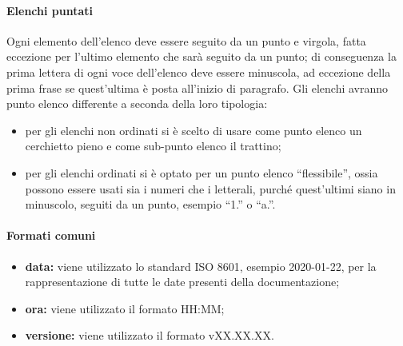 			\paragraph{Elenchi puntati}
				Ogni elemento dell'elenco deve essere seguito da un punto e virgola, fatta eccezione per l'ultimo elemento che sarà seguito da un punto; di conseguenza la prima lettera di ogni voce dell'elenco deve essere minuscola, ad eccezione della prima frase se quest'ultima è posta all'inizio di paragrafo. Gli elenchi avranno punto elenco differente a seconda della loro tipologia:
				\begin{itemize}
					\item per gli elenchi non ordinati si è scelto di usare come punto elenco un cerchietto pieno e come sub-punto elenco il trattino;
					\item per gli elenchi ordinati si è optato per un punto elenco ``flessibile'', ossia possono essere usati sia i numeri che i letterali, purché quest'ultimi siano in minuscolo, seguiti da un punto, esempio ``1.'' o ``a.''.
				\end{itemize}
			\paragraph{Formati comuni}
				\begin{itemize}
					\item \textbf{data:} viene utilizzato lo standard ISO 8601, esempio 2020-01-22, per la rappresentazione di tutte le date presenti della documentazione;
					\item \textbf{ora:} viene utilizzato il formato HH:MM;
					\item \textbf{versione:} viene utilizzato il formato vXX.XX.XX.
				\end{itemize}
